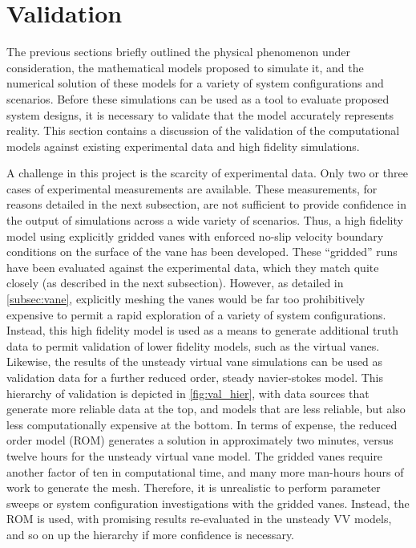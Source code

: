 
\section{Validation}
\label{sec:validation}

%
%
%

%
%

The previous sections briefly outlined the physical phenomenon under
consideration, the mathematical models proposed to simulate it,
and the numerical solution of these models for a variety of system 
configurations and scenarios. Before these simulations can be used 
as a tool to evaluate proposed system designs,
it is necessary to validate that the model accurately represents reality.  
This section contains a discussion of the validation of the computational models
against existing experimental data and high fidelity simulations.

A challenge in this project is the scarcity of experimental data. Only
two or three cases of experimental measurements are available. These
measurements, for reasons detailed in the next subsection, are not
sufficient to provide confidence in the output of simulations across a
wide variety  of scenarios. Thus, a high fidelity model using explicitly
gridded vanes with enforced no-slip velocity boundary conditions on the
surface of the vane has been developed. These ``gridded'' runs have been
evaluated against the experimental data, which they match quite closely
(as described in the next subsection). However, as detailed in
\ref{subsec:vane}, explicitly meshing the vanes would be far too
prohibitively expensive to permit a rapid exploration of a variety of
system configurations. Instead, this high fidelity model is used as a
means to generate additional truth data to permit validation of lower
fidelity models, such as the virtual vanes. Likewise, the results of the
unsteady virtual vane simulations can be used as validation data for a
further reduced order, steady navier-stokes model. This hierarchy of
validation is depicted in \ref{fig:val_hier}, with data sources that
generate more reliable data at the top, and models that are less
reliable, but also less computationally expensive at the bottom. In
terms of expense, the reduced order model (ROM) generates a solution in
approximately two minutes, versus twelve hours for the unsteady virtual
vane model. The gridded vanes require another factor of ten in
computational time, and many more man-hours hours of work to generate
the mesh. Therefore, it is unrealistic to perform parameter sweeps or
system configuration investigations with the gridded vanes. Instead, the
ROM is used, with promising results re-evaluated in the unsteady VV
models, and so on up the hierarchy if more confidence is necessary.


